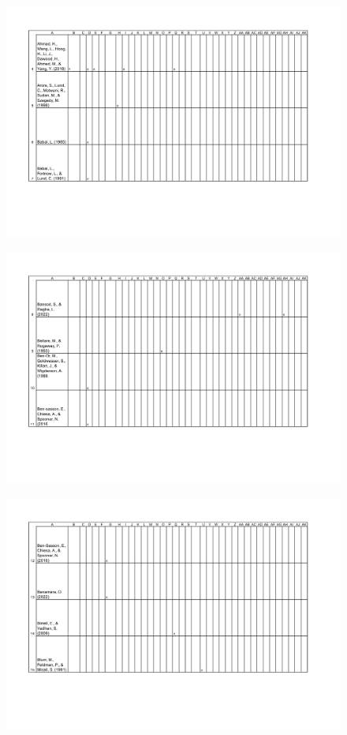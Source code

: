 \begin{figure}[H]
	\centering
		\includegraphics[width=1.0\textwidth]{Pictures/concept_matrix/wos-02.png}
\end{figure}
\begin{figure}[H]
	\centering
		\includegraphics[width=1.0\textwidth]{Pictures/concept_matrix/wos-03.png}
\end{figure}
\begin{figure}[H]
	\centering
		\includegraphics[width=1.0\textwidth]{Pictures/concept_matrix/wos-04.png}
\end{figure}
